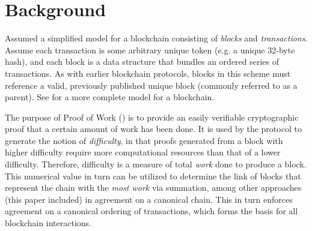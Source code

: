 \section{Background}
\label{background}

Assumed a simplified model for a blockchain consisting of \textit{blocks} and \textit{transactions}. Assume each transaction is some arbitrary unique token (e.g. a unique 32-byte hash), and each block is a data structure that
bundles an ordered series of transactions. As with earlier blockchain protocols, blocks in this scheme must reference a valid, previously published unique block (commonly referred to as a parent). See \cite{wood2014ethereum} for a more complete model for a blockchain. 

The purpose of Proof of Work (\cite{nakamoto2008}) is to provide an easily verifiable cryptographic proof that a certain amount of work has been done. It is used by the protocol to generate the notion of \textit{difficulty}, in that proofs generated from a block with higher difficulty require more computational resources than that of a lower difficulty. Therefore, difficulty is a measure of total \textit{work} done to produce a block. This numerical value in turn can be utilized to determine the link of blocks that represent the chain with the \textit{most work} via summation, among other approaches (this paper included) in agreement on a canonical chain. This in turn enforces agreement on a canonical ordering of transactions, which forms the basis for all blockchain interactions.
